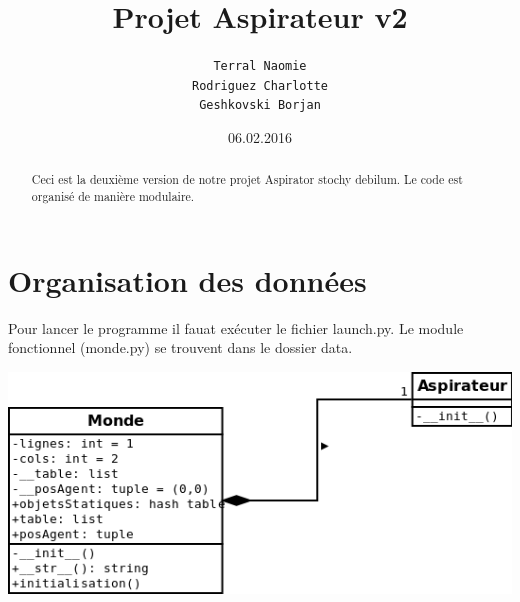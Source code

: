 \documentclass[a4paper,10pt]{article}
\title{Projet Aspirateur v2}
\author{\texttt{Terral Naomie}\\
		\texttt{Rodriguez Charlotte}\\
		\texttt{Geshkovski Borjan}
		}
\date{06.02.2016}
\begin{document}
\maketitle

\begin{abstract}
Ceci est la deuxième version de notre projet Aspirator stochy debilum. Le code est organisé de manière modulaire. 
\end{abstract}

\section*{Organisation des données}
Pour lancer le programme il fauat exécuter le fichier launch.py. Le module fonctionnel (monde.py) se trouvent dans le dossier data.\\ 

\begin{center}
\includegraphics[scale=0.5]{architecture}
\end{center}
\end{document}
